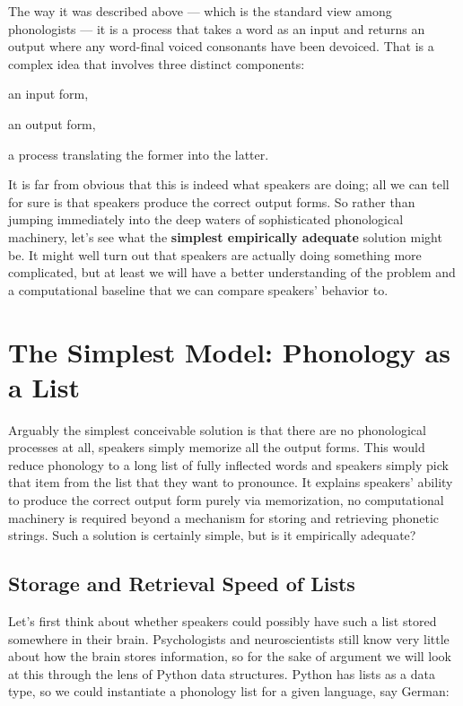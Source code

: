The way it was described above --- which is the standard view among phonologists --- it is a process that takes a word as an input and returns an output where any word-final voiced consonants have been devoiced.
That is a complex idea that involves three distinct components:
%
\begin{enumerate*}
    \item an input form,
    \item an output form,
    \item a process translating the former into the latter.
\end{enumerate*}
%
It is far from obvious that this is indeed what speakers are doing; all we can tell for sure is that speakers produce the correct output forms.
So rather than jumping immediately into the deep waters of sophisticated phonological machinery, let's see what the \textbf{simplest empirically adequate} solution might be.
It might well turn out that speakers are actually doing something more complicated, but at least we will have a better understanding of the problem and a computational baseline that we can compare speakers' behavior to.


\section{The Simplest Model: Phonology as a List}

Arguably the simplest conceivable solution is that there are no phonological processes at all, speakers simply memorize all the output forms.
This would reduce phonology to a long list of fully inflected words and speakers simply pick that item from the list that they want to pronounce.
It explains speakers' ability to produce the correct output form purely via memorization, no computational machinery is required beyond a mechanism for storing and retrieving phonetic strings. 
Such a solution is certainly simple, but is it empirically adequate?

\subsection{Storage and Retrieval Speed of Lists}

Let's first think about whether speakers could possibly have such a list stored somewhere in their brain.
Psychologists and neuroscientists still know very little about how the brain stores information, so for the sake of argument we will look at this through the lens of Python data structures.
Python has lists as a data type, so we could instantiate a phonology list for a given language, say German:
%

